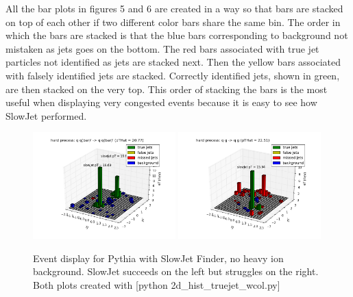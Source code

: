 \documentclass[11pt]{article}
\begin{document}
All the bar plots in figures 5 and 6 are created in a way so that bars are stacked on top of each other if two different color bars share the same bin. The order in which the bars are stacked is that the blue bars corresponding to background not mistaken as jets goes on the bottom. The red bars associated with true jet particles not identified as jets are stacked next. Then the yellow bars associated with falsely identified jets are stacked. Correctly identified jets, shown in green, are then stacked on the very top. This order of stacking the bars is the most useful when displaying very congested events because it is easy to see how SlowJet performed.

\begin{figure}[h]
\begin{center}
\includegraphics[width=0.49\textwidth]{2d_hist_truejet_wcol1.png}
\includegraphics[width=0.49\textwidth]{2d_hist_truejet_wcol2.png}
\label{fig_label}
\caption{Event display for Pythia with SlowJet Finder, no heavy ion background.  SlowJet succeeds on the left but struggles on the right. Both plots created with [python 2d\_hist\_truejet\_wcol.py]}
\end{center}
\end{figure}
\end{document}

